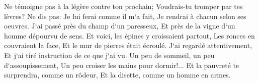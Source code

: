 \verse Ne témoigne pas à la légère contre ton prochain; Voudrais-tu tromper par tes lèvres? 
\verse Ne dis pas: Je lui ferai comme il m`a fait, Je rendrai à chacun selon ses oeuvres. 
\verse J`ai passé près du champ d`un paresseux, Et près de la vigne d`un homme dépourvu de sens. 
\verse Et voici, les épines y croissaient partout, Les ronces en couvraient la face, Et le mur de pierres était écroulé. 
\verse J`ai regardé attentivement, Et j`ai tiré instruction de ce que j`ai vu. 
\verse Un peu de sommeil, un peu d`assoupissement, Un peu croiser les mains pour dormir!... 
\verse Et la pauvreté te surprendra, comme un rôdeur, Et la disette, comme un homme en armes. 

\chapter{}

